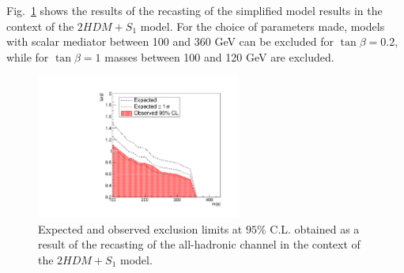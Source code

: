 Fig.~\ref{fig:resultsS1} shows the results of the recasting of the simplified model results in the context of the 
$2HDM+S_1$ model. For the choice of parameters made, models with scalar mediator between 100 and 360 GeV 
can be excluded for $\tan\beta = 0.2$, while for $\tan\beta = 1$ masses between 100 and 120 GeV are excluded.

\begin{figure}
  \centering
  \includegraphics[width=0.6\textwidth]{texinputs/04_grid/figures/DMHF/THDMs/resultsS1.pdf}
\caption{Expected and observed exclusion limits at $95\%$ C.L. obtained as a result of the recasting of the all-hadronic channel
in the context of the $2HDM+S_1$ model.}
  \label{fig:resultsS1}
\end{figure}



%



